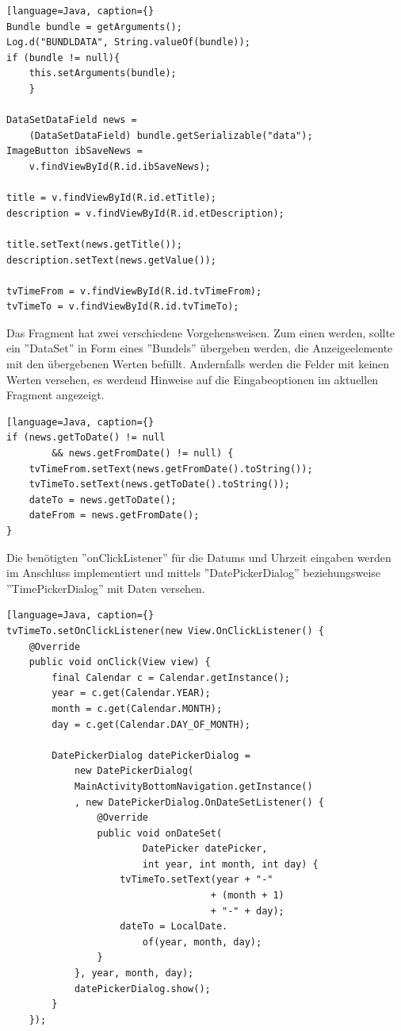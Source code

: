 \begin{lstlisting}[language=Java, caption={}
Bundle bundle = getArguments();
Log.d("BUNDLDATA", String.valueOf(bundle));
if (bundle != null){
    this.setArguments(bundle);
    }
            
DataSetDataField news =
 	(DataSetDataField) bundle.getSerializable("data");
ImageButton ibSaveNews =
  	v.findViewById(R.id.ibSaveNews);
        
title = v.findViewById(R.id.etTitle);
description = v.findViewById(R.id.etDescription);

title.setText(news.getTitle());
description.setText(news.getValue());

tvTimeFrom = v.findViewById(R.id.tvTimeFrom);
tvTimeTo = v.findViewById(R.id.tvTimeTo);
\end{lstlisting}

Das Fragment hat zwei verschiedene Vorgehensweisen. Zum einen werden, sollte ein ''DataSet'' in Form eines ''Bundels'' übergeben werden, die Anzeigeelemente mit den übergebenen Werten befüllt. Andernfalls werden die Felder mit keinen Werten versehen, es werdend Hinweise auf die Eingabeoptionen im aktuellen Fragment angezeigt.

\begin{lstlisting}[language=Java, caption={}
if (news.getToDate() != null 
		&& news.getFromDate() != null) {
    tvTimeFrom.setText(news.getFromDate().toString());
    tvTimeTo.setText(news.getToDate().toString());
    dateTo = news.getToDate();
    dateFrom = news.getFromDate();
}   
\end{lstlisting}

Die benötigten ''onClickListener'' für die Datums und Uhrzeit eingaben werden im Anschluss implementiert und mittels ''DatePickerDialog'' beziehungsweise ''TimePickerDialog'' mit Daten versehen. 
\begin{lstlisting}[language=Java, caption={}
tvTimeTo.setOnClickListener(new View.OnClickListener() {
	@Override
    public void onClick(View view) {
    	final Calendar c = Calendar.getInstance();
        year = c.get(Calendar.YEAR);
        month = c.get(Calendar.MONTH);
        day = c.get(Calendar.DAY_OF_MONTH);

        DatePickerDialog datePickerDialog = 
        	new DatePickerDialog(
            MainActivityBottomNavigation.getInstance()
            , new DatePickerDialog.OnDateSetListener() {
            	@Override
                public void onDateSet(
                  		DatePicker datePicker,
                   		int year, int month, int day) {
                	tvTimeTo.setText(year + "-" 
                        			+ (month + 1)
                        			+ "-" + day);
                    dateTo = LocalDate.
                    	of(year, month, day);
                }
            }, year, month, day);
            datePickerDialog.show();
        }
    });
\end{lstlisting}


